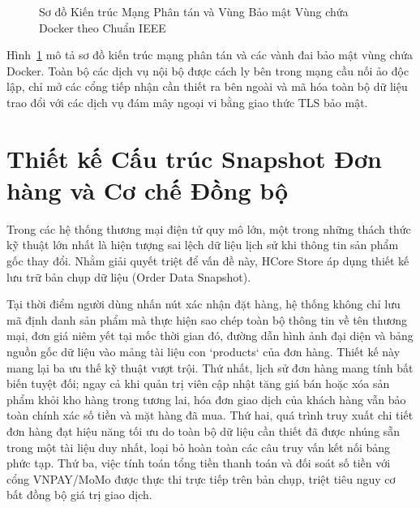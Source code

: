 \begin{figure}[htbp]
\caption{Sơ đồ Kiến trúc Mạng Phân tán và Vùng Bảo mật Vùng chứa Docker theo Chuẩn IEEE}
\label{fig:network_security}
\end{figure}

Hình~\ref{fig:network_security} mô tả sơ đồ kiến trúc mạng phân tán và các vành đai bảo mật vùng chứa Docker. Toàn bộ các dịch vụ nội bộ được cách ly bên trong mạng cầu nối ảo độc lập, chỉ mở các cổng tiếp nhận cần thiết ra bên ngoài và mã hóa toàn bộ dữ liệu trao đổi với các dịch vụ đám mây ngoại vi bằng giao thức TLS bảo mật.

\section{Thiết kế Cấu trúc Snapshot Đơn hàng và Cơ chế Đồng bộ}
Trong các hệ thống thương mại điện tử quy mô lớn, một trong những thách thức kỹ thuật lớn nhất là hiện tượng sai lệch dữ liệu lịch sử khi thông tin sản phẩm gốc thay đổi. Nhằm giải quyết triệt để vấn đề này, HCore Store áp dụng thiết kế lưu trữ bản chụp dữ liệu (Order Data Snapshot).

Tại thời điểm người dùng nhấn nút xác nhận đặt hàng, hệ thống không chỉ lưu mã định danh sản phẩm mà thực hiện sao chép toàn bộ thông tin về tên thương mại, đơn giá niêm yết tại mốc thời gian đó, đường dẫn hình ảnh đại diện và bảng nguồn gốc dữ liệu vào mảng tài liệu con `products` của đơn hàng. Thiết kế này mang lại ba ưu thế kỹ thuật vượt trội. Thứ nhất, lịch sử đơn hàng mang tính bất biến tuyệt đối; ngay cả khi quản trị viên cập nhật tăng giá bán hoặc xóa sản phẩm khỏi kho hàng trong tương lai, hóa đơn giao dịch của khách hàng vẫn bảo toàn chính xác số tiền và mặt hàng đã mua. Thứ hai, quá trình truy xuất chi tiết đơn hàng đạt hiệu năng tối ưu do toàn bộ dữ liệu cần thiết đã được nhúng sẵn trong một tài liệu duy nhất, loại bỏ hoàn toàn các câu truy vấn kết nối bảng phức tạp. Thứ ba, việc tính toán tổng tiền thanh toán và đối soát số tiền với cổng VNPAY/MoMo được thực thi trực tiếp trên bản chụp, triệt tiêu nguy cơ bất đồng bộ giá trị giao dịch.

